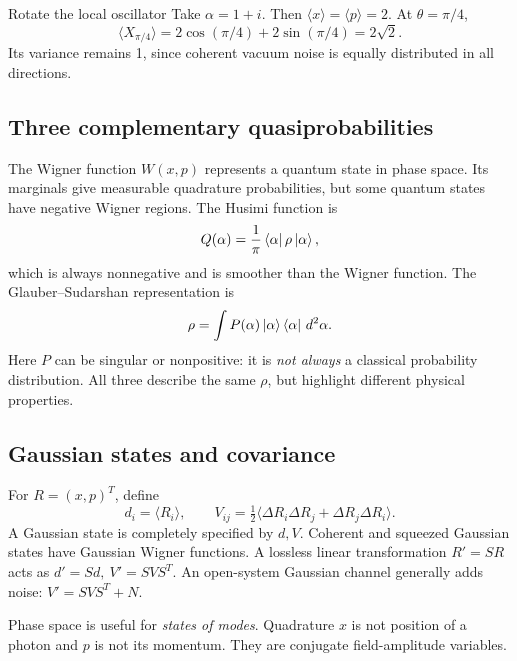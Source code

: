 \begin{worked}{Rotate the local oscillator}
Take \(\alpha=1+i\). Then
\(\langle x\rangle=\langle p\rangle=2\).
At \(\theta=\pi/4\),
\[
\langle X_{\pi/4}\rangle
=2\cos(\pi/4)+2\sin(\pi/4)=2\sqrt2.
\]
Its variance remains 1, since coherent
vacuum noise is equally distributed
in all directions.
\end{worked}

\subsection{Three complementary quasiprobabilities}
The Wigner function \(W(x,p)\) represents
a quantum state in phase space. Its
marginals give measurable quadrature
probabilities, but some quantum states
have negative Wigner regions.
The Husimi function is
\[
Q(\alpha)=\frac1\pi\left\langle \alpha\right\rvert\rho\left\lvert \alpha\right\rangle,
\]
which is always nonnegative and is smoother
than the Wigner function. The
Glauber--Sudarshan representation is
\[
\rho=\int P(\alpha)\left\lvert \alpha\right\rangle\left\langle \alpha\right\rvert\,d^2\alpha.
\]
Here \(P\) can be singular or nonpositive:
it is \emph{not always} a classical
probability distribution.
All three describe the same \(\rho\), but
highlight different physical properties.

\subsection{Gaussian states and covariance}
For \(R=(x,p)^T\), define
\[
d_i=\langle R_i\rangle,\qquad
V_{ij}=\tfrac12\langle\Delta R_i\Delta R_j+
\Delta R_j\Delta R_i\rangle.
\]
A Gaussian state is completely specified
by \(d,V\). Coherent and squeezed Gaussian
states have Gaussian Wigner functions.
A lossless linear transformation \(R'=SR\)
acts as \(d'=Sd,\ V'=SVS^T\).
An open-system Gaussian channel generally adds
noise: \(V'=SVS^T+N\).

\begin{checkpoint}
Phase space is useful for \emph{states of modes}.
Quadrature \(x\) is not position of a photon
and \(p\) is not its momentum. They are
conjugate field-amplitude variables.
\end{checkpoint}
